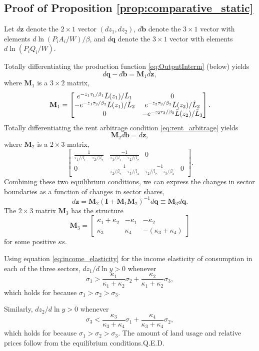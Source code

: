 \documentclass[12pt]{article}
\begin{document}
\subsection{Proof of Proposition \ref{prop:comparative_static}}
Let $d\mathbf z$ denote the $2\times1$ vector $(dz_1,dz_2)$, $d\mathbf b$ denote the $3\times1$ vector with elements $d\ln(P_iA_i/W)/\beta$, and $d\mathbf q$ denote the $3\times1$ vector with elements $d\ln(P_iQ_i/W)$.

Totally differentiating the production function \eqref{eq:OutputInterm} (below) yields
\[
d\mathbf q - d\mathbf b = \mathbf M_1 d\mathbf z,
\]
where $\mathbf M_1$ is a $3\times2$ matrix,
\[
\mathbf M_1 =
\begin{bmatrix}
	e^{-z_1\tau_1/\beta_1}\Bar L(z_1)/\tilde L_1 & 0\\
	-e^{-z_1\tau_2/\beta_2}\Bar L(z_1)/\tilde L_2 &
		e^{-z_2\tau_2/\beta_2}\Bar L(z_2)/\tilde L_2\\
	0 & -e^{-z_2\tau_3/\beta_3}\Bar L(z_2)/\tilde L_3
\end{bmatrix}.
\]
Totally differentiating the rent arbitrage condition \eqref{eq:rent_arbitrage} yields
\[
\mathbf M_2 d\mathbf b = d\mathbf z,
\]
where $\mathbf M_2$ is a $2\times3$ matrix,
\[
\begin{bmatrix}
	\frac 1
		{\tau_1/\beta_1 - \tau_2/\beta_2}
	& 	\frac {-1}
		{\tau_1/\beta_1 - \tau_2/\beta_2}
	& 0 \\
	0
	& \frac 1
		{\tau_2/\beta_2 - \tau_3/\beta_3}
	& 	\frac {-1}
		{\tau_2/\beta_2 - \tau_3/\beta_3}
	& 0
\end{bmatrix}.
\]
Combining these two equilibrium conditions, we can express the changes in sector boundaries as a function of changes in sector shares,
\[
d\mathbf z = \mathbf M_2 (\mathbf I+\mathbf M_1\mathbf M_2)^{-1}d\mathbf q \equiv \mathbf M_3 d\mathbf q.
\]
The $2\times3$ matrix $\mathbf M_3$ has the structure
\[
\mathbf M_3 =
\begin{bmatrix}
\kappa_1+\kappa_2 	& -\kappa_1 	& -\kappa_2 \\
\kappa_3 			& \kappa_4		& -(\kappa_3+\kappa_4)
\end{bmatrix}
\]
for some positive $\kappa$s.

Using equation \eqref{eq:income_elasticity} for the income elasticity of consumption in each of the three sectors, $dz_1/d\ln y>0$ whenever
\[
\sigma_1> \frac{\kappa_1}{\kappa_1+\kappa_2}\sigma_2 + \frac{\kappa_2}{\kappa_1+\kappa_2}\sigma_3,
\]
which holds for because $\sigma_1>\sigma_2>\sigma_3$.

Similarly, $dz_2/d\ln y>0$ whenever
\[
\sigma_3 < \frac{\kappa_3}{\kappa_3+\kappa_4}\sigma_1 + \frac{\kappa_4}{\kappa_3+\kappa_4}\sigma_2,
\]
which holds for because $\sigma_1>\sigma_2>\sigma_3$. The amount of land usage and relative prices follow from the equilibrium conditions.\hfill Q.E.D.
\end{document}
